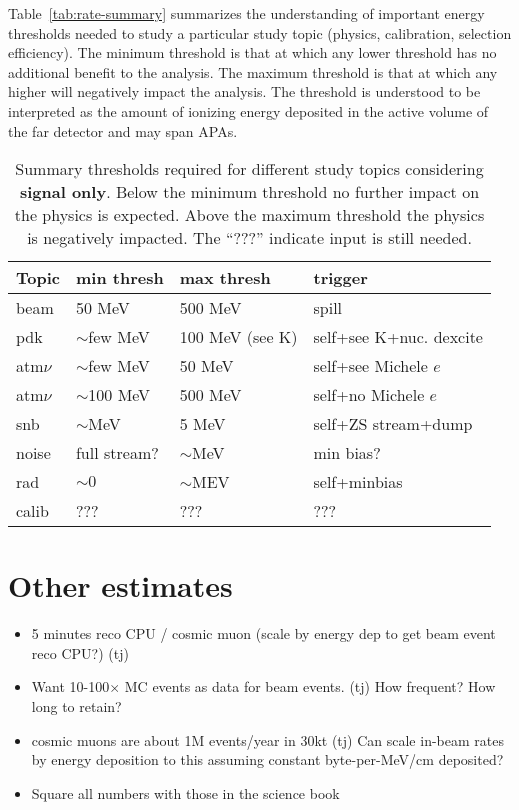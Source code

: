 Table~\ref{tab:rate-summary} summarizes the understanding of important
energy thresholds needed to study a particular study topic (physics,
calibration, selection efficiency).
The minimum threshold is that at which any lower threshold has no
additional benefit to the analysis.
The maximum threshold is that at which any higher will negatively
impact the analysis.
The threshold is understood to be interpreted as the amount of
ionizing energy deposited in the active volume of the far detector
and may span APAs.

\begin{table}[htbf]
  \centering
  \begin{tabular}{|l||l|l|l|}
    \hline
    Topic & min thresh & max thresh & trigger \\
    \hline
    \hline
    beam & 50 MeV & 500 MeV & spill \\
    \hline
    pdk & $\sim$few MeV & 100 MeV (see K) & self+see K+nuc. dexcite \\
    \hline
    atm$\nu$ & $\sim$few MeV & 50 MeV &
    self+see Michele $e$ \\
    atm$\nu$ & $\sim$100 MeV & 500 MeV &
    self+no Michele $e$ \\
    \hline
    snb & $\sim$MeV & 5 MeV & self+ZS stream+dump \\
    \hline
    noise & full stream?&$\sim$MeV& min bias?\\
    \hline
    rad &$\sim 0$ & $\sim$MEV & self+minbias\\
    \hline
    calib & ??? & ??? & ??? \\
    \hline
  \end{tabular}
  \caption{Summary thresholds required for different study topics
    considering \textbf{signal only}.
  Below the minimum threshold no further impact on the physics is
  expected.
  Above the maximum threshold the physics is negatively impacted.
  The ``???'' indicate input is still needed.}
  \label{tab:physrates}
\end{table}

\section{Other estimates}

\begin{itemize}
\item 5 minutes reco CPU / cosmic muon (scale by energy dep to get
  beam event reco CPU?)
  (tj)
\item Want 10-100$\times$ MC events as data for beam events.
  (tj)
  How frequent?
  How long to retain?
\item cosmic muons are about 1M events/year in 30kt (tj)
Can scale in-beam rates by energy deposition to this assuming constant
byte-per-MeV/cm deposited?
\item Square all numbers with those in the science book  
\end{itemize}

